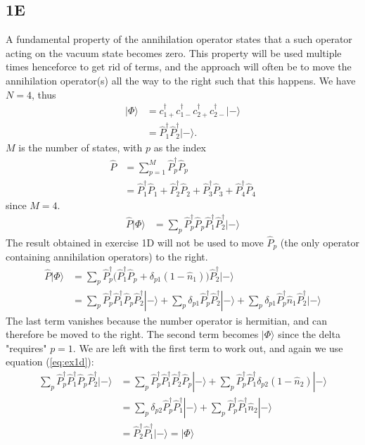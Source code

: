 \documentclass[norsk,a4paper,12pt]{article}
\begin{document}
\subsection*{1E}
A fundamental property of the annihilation operator states that a such operator acting on the vacuum state becomes zero. This property will be used multiple times henceforce to get rid of terms, and the approach will often be to move the annihilation operator(s) all the way to the right such that this happens. 
We have $N=4$, thus 
\begin{align*}
|\Phi\rangle&=c_{1+}^{\dagger}c_{1-}^{\dagger}c_{2+}^{\dagger}c_{2-}^{\dagger}|-\rangle\\
&=\hat{P}_1^{\dagger}\hat{P}_2^{\dagger}|-\rangle.
\end{align*}
$M$ is the number of states, with $p$ as the index
\begin{align*}
\hat{P}&=\sum_{p=1}^M\hat{P}_p^{\dagger}\hat{P}_p\\
&=\hat{P}_1^{\dagger}\hat{P}_1+\hat{P}_2^{\dagger}\hat{P}_2+\hat{P}_3^{\dagger}\hat{P}_3+\hat{P}_4^{\dagger}\hat{P}_4
\end{align*}
since $M=4$. 
\begin{align*}
\hat{P}|\Phi\rangle&=\sum_p\hat{P}_p^{\dagger}\hat{P}_p\hat{P}_1^{\dagger}\hat{P}_2^{\dagger}|-\rangle
\end{align*}
The result obtained in exercise 1D will not be used to move $\hat{P}_p$ (the only operator containing annihilation operators) to the right. 
\begin{align*}
\hat{P}|\Phi\rangle
&=\sum_p\hat{P}_p^{\dagger}\Big(\hat{P}_1^{\dagger}\hat{P}_p+\delta_{p1}(1-\hat{n}_1)\Big)\hat{P}_2^{\dagger}|-\rangle\\
&=\sum_p\hat{P}_p^{\dagger}\hat{P}_1^{\dagger}\hat{P}_p\hat{P}_2^{\dagger}|-\rangle+\sum_p\delta_{p1}\hat{P}_p^{\dagger}\hat{P}_2^{\dagger}|-\rangle+\sum_p\delta_{p1}\hat{P}_p^{\dagger}\hat{n}_1\hat{P}_2^{\dagger}|-\rangle
\end{align*}
The last term vanishes because the number operator is hermitian, and can therefore be moved to the right. The second term becomes $|\Phi\rangle$ since the delta "requires" $p=1$. We are left with the first term to work out, and again we use equation (\ref{eq:ex1d}):
\begin{align*}
\sum_p\hat{P}_p^{\dagger}\hat{P}_1^{\dagger}\hat{P}_p\hat{P}_2^{\dagger}|-\rangle
&=\sum_p\hat{P}_p^{\dagger}\hat{P}_1^{\dagger}\hat{P}_2^{\dagger}\hat{P}_p|-\rangle+\sum_p\hat{P}_p^{\dagger}\hat{P}_1^{\dagger}\delta_{p2}(1-\hat{n}_2)|-\rangle\\
&=\sum_p\delta_{p2}\hat{P}_p^{\dagger}\hat{P}_1^{\dagger}|-\rangle+\sum_p\hat{P}_p^{\dagger}\hat{P}_1^{\dagger}\hat{n}_2|-\rangle\\
&=\hat{P}_2^{\dagger}\hat{P}_1^{\dagger}|-\rangle=|\Phi\rangle
\end{align*}
\end{document}
